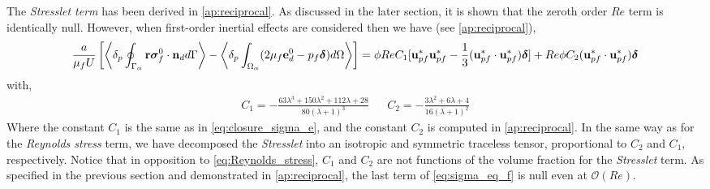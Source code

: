 The \textit{Stresslet term} has been derived in \ref{ap:reciprocal}. 
As discussed in the later section, it is shown that the zeroth order $Re$ term is identically null. 
However, when first-order inertial effects are considered then we have (see \ref{ap:reciprocal}),
\begin{equation*}
    \frac{a}{\mu_f U}\left[
        \pSavg{\textbf{r}\bm{\sigma}_f^0 \cdot \textbf{n}_d}
        - \pOavg{(2 \mu_f \textbf{e}_d^0 - p_f\bm\delta)}
        \right]
    =
     \phi Re C_1
    [
        \textbf{u}_{pf}^*\textbf{u}_{pf}^* - \frac{1}{3}(\textbf{u}_{pf}^*\cdot \textbf{u}_{pf}^*)\bm\delta 
    ]\\
    + Re \phi C_2 (\textbf{u}_{pf}^*\cdot \textbf{u}_{pf}^*) \bm\delta
    \label{eq:stresslet_trans}
\end{equation*} 
with, 
\begin{align}
    C_1  =  -\frac{63 \lambda^{3} + 150 \lambda^{2} + 112 \lambda + 28}{80 \left(\lambda + 1\right)^{3}}
    &&
    C_2  = - \frac{3\lambda^2 + 6\lambda + 4}{16(\lambda +1 )^2}
\end{align}
Where the constant $C_1$ is the same as in \ref{eq:closure_sigma_e}, and the constant $C_2$ is computed in  \ref{ap:reciprocal}. 
In the same way as for the \textit{Reynolds stress} term, we have decomposed the \textit{Stresslet} into an isotropic and symmetric traceless tensor, proportional to $C_2$ and $C_1$, respectively. 
Notice that in opposition to \ref{eq:Reynolds_stress}, $C_1$ and $C_2$ are not functions of the volume fraction for the \textit{Stresslet} term. 
As specified in the previous section and demonstrated in \ref{ap:reciprocal}, the last term of \ref{eq:sigma_eq_f} is null even at $\mathcal{O}(Re)$. 


